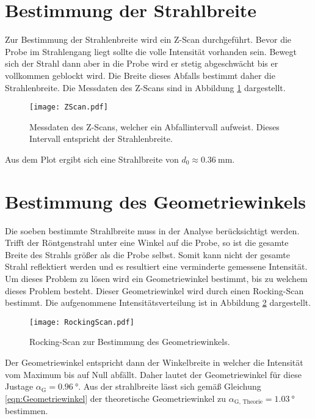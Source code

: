 \section{Bestimmung der Strahlbreite}
\label{sec:ZScan}
Zur Bestimmung der Strahlenbreite wird ein Z-Scan durchgeführt. Bevor die Probe im Strahlengang liegt sollte die volle Intensität vorhanden sein. Bewegt sich der Strahl dann aber in 
die Probe wird er stetig abgeschwächt bis er vollkommen geblockt wird. Die Breite dieses Abfalls bestimmt daher die Strahlenbreite. Die Messdaten des Z-Scans sind in Abbildung 
\ref{fig:ZScan} dargestellt.

\begin{figure}
    \centering
    \texttt{[image: ZScan.pdf]}
    \caption{Messdaten des Z-Scans, welcher ein Abfallintervall aufweist. Dieses Intervall entspricht der Strahlenbreite.}
    \label{fig:ZScan}
\end{figure}

Aus dem Plot ergibt sich eine Strahlbreite von $d_0 \approx \qty{0.36}{\milli\metre}$. 

\section{Bestimmung des Geometriewinkels}
\label{sec:Rocking}

Die soeben bestimmte Strahlbreite muss in der Analyse berücksichtigt werden. Trifft der Röntgenstrahl unter eine Winkel auf die Probe, so ist die gesamte Breite des Strahls größer als 
die Probe selbst. Somit kann nicht der gesamte Strahl reflektiert werden und es resultiert eine verminderte gemessene Intensität. Um dieses Problem zu lösen wird ein Geometriewinkel 
bestimmt, bis zu welchem dieses Problem besteht. Dieser Geometriewinkel wird durch einen Rocking-Scan bestimmt. Die aufgenommene Intensitätsverteilung ist in Abbildung 
\ref{fig:RockingScan} dargestellt. 
\begin{figure}
    \centering
    \texttt{[image: RockingScan.pdf]}
    \caption{Rocking-Scan zur Bestimmung des Geometriewinkels.}
    \label{fig:RockingScan}
\end{figure}
Der Geometriewinkel entspricht dann der Winkelbreite in welcher die Intensität vom Maximum bis auf Null abfällt. Daher lautet der Geometriewinkel für diese Justage
$\alpha_\text{G} = \qty{0.96}{\degree}$. Aus der strahlbreite lässt sich gemäß Gleichung \ref{eqn:Geometriewinkel} der theoretische Geometriewinkel zu 
$\alpha_\text{G, Theorie} = \qty{1.03}{\degree}$ bestimmen.

